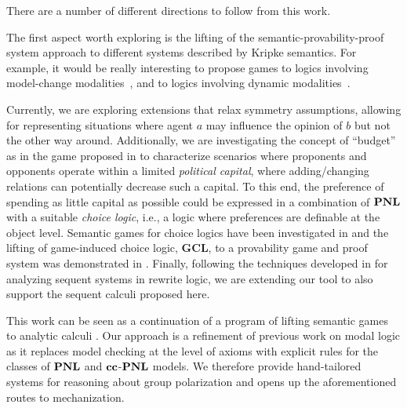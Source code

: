 
There are a number of different directions to follow from this work.

The first aspect worth exploring is the lifting of the semantic-provability-proof system approach to different systems described by Kripke semantics. For example, it would be really interesting to propose games to logics involving model-change modalities~\cite{DBLP:journals/logcom/Velazquez-Quesada17,DBLP:journals/igpl/PerrotinV21}, and to logics involving dynamic modalities~\cite{DBLP:journals/synthese/BenthemGL08}. 

Currently, we are exploring extensions that relax
symmetry assumptions, allowing for representing situations where agent $a$ may
influence the opinion of $b$ but not the other way around. Additionally, we are
investigating the concept of ``budget'' as in the game proposed in
\cite{DBLP:conf/tableaux/LangOPF19} to characterize scenarios where proponents
and opponents operate within a limited \emph{political capital}, where
adding/changing relations can potentially decrease such a capital. 
To this end, the preference of spending as little capital as possible could be expressed in a combination of $\textbf{PNL}$ with a suitable \emph{choice logic}, i.e., a logic where preferences are definable at the object level. Semantic games for choice logics have been investigated in \cite{Freiman2023TruthLogic} and the lifting of game-induced choice logic, \textbf{GCL}, to a provability game and proof system was demonstrated in \cite{Freiman2023}.
Finally, following
the techniques developed in \cite{DBLP:journals/jlap/OlartePR23} 
for analyzing sequent systems in rewrite logic, we are extending 
our tool \cite{tool} to also support the sequent calculi proposed here. 

This work can be seen as a continuation of a program of lifting semantic games
to analytic calculi \cite{DBLP:journals/sLogica/FermullerM09,Pavlova2021}. Our
approach is a refinement of previous work on modal logic
\cite{DBLP:conf/wollic/Freiman21,HybrJour}  as it replaces model checking at
the level of axioms with explicit rules for the classes of $\textbf{PNL}$ and
$\textbf{cc}$-$\textbf{PNL}$ models. We therefore  provide hand-tailored systems for reasoning about
group polarization and opens up the aforementioned routes to mechanization.